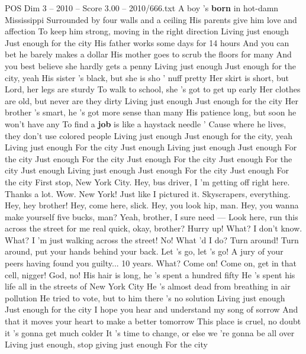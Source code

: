 \begin{textsample}{POS Dim 3 – 2010 – Score 3.00 – 2010/666.txt}  \label{ex:f3_pos_022}
A boy 's \textbf{born} in hot-damn Mississippi Surrounded by four walls and a ceiling His parents give him love and affection To keep him strong, moving in the right direction Living just enough Just enough for the city His father works some days for 14 hours And you can bet he barely makes a dollar His mother goes to scrub the floors for many And you best believe she hardly gets a penny Living just enough Just enough for the city, yeah His sister 's black, but she is sho ' nuff pretty Her skirt is short, but Lord, her legs are sturdy To walk to school, she 's got to get up early Her clothes are old, but never are they dirty Living just enough Just enough for the city Her brother 's smart, he 's got more sense than many His patience long, but soon he won't have any To find a \textbf{job} is like a haystack needle ' Cause where he lives, they don't use colored people Living just enough Just enough for the city, yeah Living just enough For the city Just enough Living just enough Just enough For the city Just enough For the city Just enough For the city Just enough For the city Just enough Living just enough Just enough For the city Just enough For the city First stop, New York City.
Hey, bus driver, I 'm getting off right here.
Thanks a lot.
Wow.
New York!
Just like I pictured it.
Skyscrapers, everything.
Hey, hey brother!
Hey, come here, slick.
Hey, you look hip, man.
Hey, you wanna make yourself five bucks, man?
Yeah, brother, I sure need — Look here, run this across the street for me real quick, okay, brother?
Hurry up!
What?
I don't know.
What?
I 'm just walking across the street!
No!
What 'd I do?
Turn around!
Turn around, put your hands behind your back.
Let 's go, let 's go!
A jury of your peers having found you guilty... 10 years.
What?
Come on!
Come on, get in that cell, nigger!
God, no!
His hair is long, he 's spent a hundred fifty He 's spent his life all in the streets of New York City He 's almost dead from breathing in air pollution He tried to vote, but to him there 's no solution Living just enough Just enough for the city I hope you hear and understand my song of sorrow And that it moves your heart to make a better tomorrow This place is cruel, no doubt it 's gonna get much colder It 's time to change, or else we 're gonna be all over Living just enough, stop giving just enough For the city

\end{textsample}
